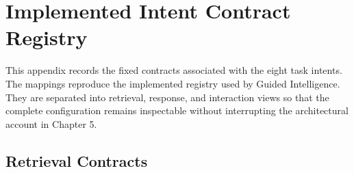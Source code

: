 \chapter{Implemented Intent Contract Registry}\label{ch:implemented-intent-contract-registry}

This appendix records the fixed contracts associated with the eight task intents. The mappings reproduce the implemented registry used by Guided Intelligence. They are separated into retrieval, response, and interaction views so that the complete configuration remains inspectable without interrupting the architectural account in Chapter 5.

\section{Retrieval Contracts}\label{sec:retrieval-contracts}

